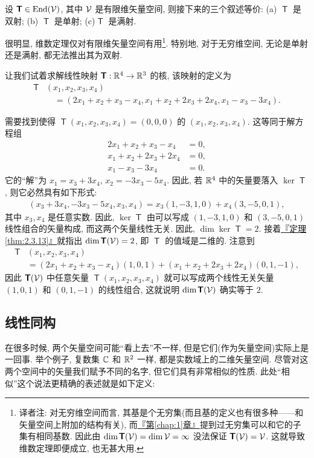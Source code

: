 \documentclass[lang=cn,zihao=-4,twoside,fontset=none]{textbook}
\DeclareMathOperator{\End}{End}
\newcommand{\bsf}[1]{{\mathop{\pmb{\mathsf{#1}}}}}
\def\eq#1{\[\begin{aligned}{}#1\end{aligned}\]}
\newcommand{\chapref}[1]{\hyperref[#1]{『第\textnormal{\ref*{#1}}章』}}
\newcommand{\thmref}[1]{\hyperref[#1]{『定理\textnormal{\ref*{#1}}』}}
\begin{document}
\begin{prop}
    \label{prop:2.3.14}%
    设 $\bsf{T}\in\End(\mV)$, 其中 ${\mathcal V}$ 是有限维矢量空间, 则接下来的三个叙述等价: (a) $\bsf{T}$ 是双射; (b) $\bsf{T}$ 是单射; (c)$\bsf{T}$ 是满射. 
\end{prop}

很明显, 维数定理仅对有限维矢量空间有用\footnote{译者注: 对无穷维空间而言, 其基是个无穷集(而且基的定义也有很多种——和矢量空间上附加的结构有关), 而\chapref{chap:1}提到过无穷集可以和它的子集有相同基数. 因此由 $\dim\bsf{T}(\mV)=\dim\mV=\infty$ 没法保证 $\bsf{T}(\mV)=\mV$. 这就导致维数定理即便成立, 也无甚大用.}. 特别地, 对于无穷维空间, 无论是单射还是满射, 都无法推出其为双射.  

\begin{exam}
    \label{eg:2.3.15}%
    让我们试着求解线性映射 $\bsf T:\bR^4\to\bR^3$ 的核, 该映射的定义为
    \eq{
        \bsf{T}&(x_1,x_2,x_3,x_4)\\
        &\quad=(2x_1+x_2+x_3-x_4,x_1+x_2+2x_3+2x_4,x_1-x_3-3x_4).
    }
\end{exam}
\begin{solution}
需要找到使得 $\bsf{T}(x_1,x_2,x_3,x_4)=(0,0,0)$ 的 $(x_1,x_2,x_3,x_4)$. 这等同于解方程组 
\eq{
 2x_1+x_2+x_3-x_4&=0,\\
 x_1+x_2+2x_3+2x_4&=0,\\
 x_1-x_3-3x_4&=0.
}
它的``解''为 $x_1=x_3+3x_4$, $x_2=-3x_3-5x_4$. 因此, 若 ${\mathbb R}^4$ 中的矢量要落入 $\ker\bsf{T}$, 则它必然具有如下形式:
\eq{
    (x_3+3x_4,-3x_3-5x_4,x_3,x_4)=x_3(1,-3,1,0)+x_4(3,-5,0,1),
}
其中 $x_3,x_4$ 是任意实数. 因此, $\ker\bsf{T}$ 由可以写成 $(1,-3,1,0)$ 和 $(3,-5,0,1)$ 线性组合的矢量构成, 而这两个矢量线性无关. 因此, $\dim\ker\bsf{T}=2$. 接着\thmref{thm:2.3.13}就指出 $\dim\bsf{T}(\mV)=2$, 即 $\bsf{T}$ 的值域是二维的. 注意到 
\eq{
    \bsf{T}&(x_1,x_2,x_3,x_4)\\
    &=(2x_1+x_2+x_3-x_4)(1,0,1)+(x_1+x_2+2x_3+2x_4)(0,1,-1),
}
 因此 $\bsf{T}(\mV)$ 中任意矢量 $\bsf{T}(x_1,x_2,x_3,x_4)$ 就可以写成两个线性无关矢量 $(1,0,1)$ 和 $(0,1,-1)$ 的线性组合, 这就说明 $\dim\bsf{T}(\mV)$ 确实等于 $2$.
\end{solution}

\newpage
\subsection{线性同构}\label{sec:2.3.2}

在很多时候, 两个矢量空间可能``看上去''不一样, 但是它们(作为矢量空间)实际上是一回事. 举个例子, 复数集 ${\mathbb C}$ 和 ${\mathbb R}^2$ 一样, 都是实数域上的二维矢量空间. 尽管对这两个空间中的矢量我们赋予不同的名字, 但它们具有非常相似的性质. 此处``相似''这个说法更精确的表述就是如下定义:
\end{document}

